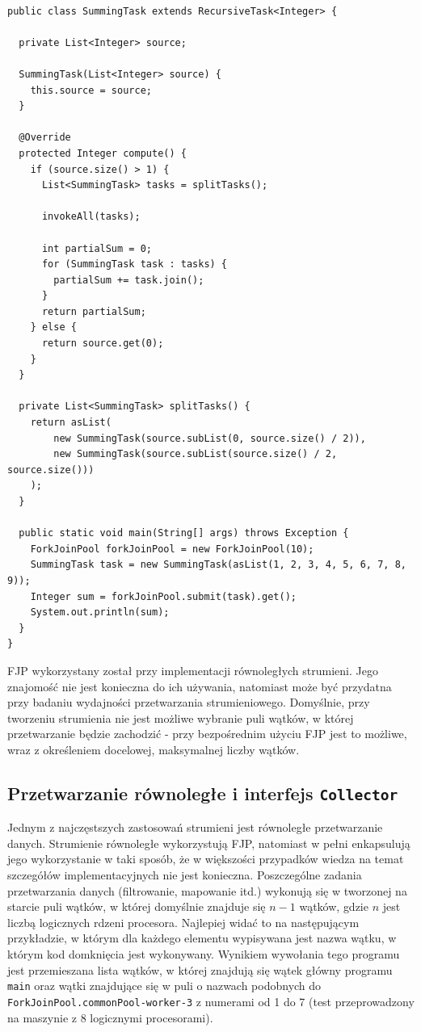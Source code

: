 \documentclass[12pt]{extarticle}
\begin{document}
\begin{lstlisting}[label=fjpexample, caption=Przykładowe wykorzystanie FJP]

public class SummingTask extends RecursiveTask<Integer> {
  
  private List<Integer> source;
  
  SummingTask(List<Integer> source) {
    this.source = source;
  }
  
  @Override
  protected Integer compute() {
    if (source.size() > 1) {
      List<SummingTask> tasks = splitTasks();
      
      invokeAll(tasks);
      
      int partialSum = 0;
      for (SummingTask task : tasks) {
        partialSum += task.join();
      }
      return partialSum;
    } else {
      return source.get(0);
    }
  }
  
  private List<SummingTask> splitTasks() {
    return asList(
        new SummingTask(source.subList(0, source.size() / 2)),
        new SummingTask(source.subList(source.size() / 2, source.size()))
    );
  }
  
  public static void main(String[] args) throws Exception {
    ForkJoinPool forkJoinPool = new ForkJoinPool(10);
    SummingTask task = new SummingTask(asList(1, 2, 3, 4, 5, 6, 7, 8, 9));
    Integer sum = forkJoinPool.submit(task).get();
    System.out.println(sum);
  }
}

\end{lstlisting}

    FJP wykorzystany został przy implementacji równoległych strumieni. Jego znajomość nie jest konieczna do ich używania, natomiast może być przydatna przy badaniu wydajności przetwarzania strumieniowego. Domyślnie, przy tworzeniu strumienia nie jest możliwe wybranie puli wątków, w której przetwarzanie będzie zachodzić - przy bezpośrednim użyciu FJP jest to możliwe, wraz z określeniem docelowej, maksymalnej liczby wątków.

\subsection{Przetwarzanie równoległe i interfejs \texttt{Collector}}

    Jednym z najczęstszych zastosowań strumieni jest równoległe przetwarzanie danych. Strumienie równoległe wykorzystują FJP, natomiast w pełni enkapsulują jego wykorzystanie w taki sposób, że w większości przypadków wiedza na temat szczegółów implementacyjnych nie jest konieczna. Poszczególne zadania przetwarzania danych (filtrowanie, mapowanie itd.) wykonują się w tworzonej na starcie puli wątków, w której domyślnie znajduje się $ n-1 $ wątków, gdzie $ n $ jest liczbą logicznych rdzeni procesora. Najlepiej widać to na następującym przykładzie, w którym dla każdego elementu wypisywana jest nazwa wątku, w którym kod domknięcia jest wykonywany.  Wynikiem wywołania tego programu jest przemieszana lista wątków, w której znajdują się wątek główny programu \texttt{main} oraz wątki znajdujące się w puli o nazwach podobnych do \texttt{ForkJoinPool.commonPool-worker-3} z numerami od 1 do 7 (test przeprowadzony na maszynie z 8 logicznymi procesorami).
\end{document}
